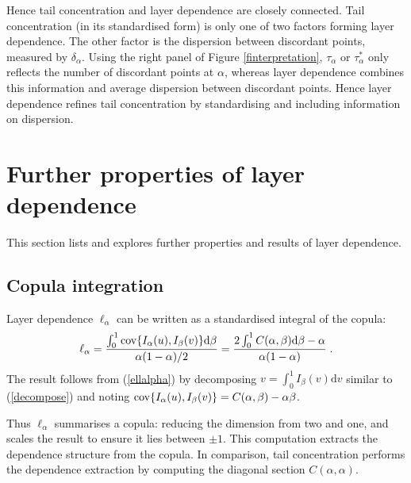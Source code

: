 \documentclass[authoryear]{elsarticle}
\newcommand{\cov}{{\rm cov}}
\newcommand{\de}{\mathrm{d}}
\newcommand{\eref}[1]{(\ref{#1})}
\newcommand{\fref}[1]{Figure \ref{#1}}
\begin{document}
Hence  tail concentration and layer dependence are closely connected. Tail concentration (in its standardised form) is only one of two factors forming layer dependence. The other factor is the dispersion between discordant points, measured by $\delta_\alpha$. Using the right panel of \fref{finterpretation}, $\tau_\alpha$ or $\tau_\alpha^*$ only reflects the number of discordant points at $\alpha$, whereas layer dependence combines this information and average dispersion between discordant points. Hence layer dependence refines tail concentration by standardising and  including  information on dispersion.





\section{Further properties of layer dependence}\label{sproperties}

This section lists and explores further properties and results of layer dependence.




\subsection{Copula integration}

Layer dependence $\ell_\alpha$ can be written as a standardised integral of the copula:
\begin{equation}\label{copula}
\ell_\alpha = \frac{\int_0^1 \cov\{I_\alpha(u),I_\beta(v)\} \de\beta }{\alpha(1-\alpha)/2}
= \frac{2 \int_0^1 C(\alpha,\beta) \de \beta- \alpha}{\alpha(1-\alpha)} \;.
\end{equation}
The result follows from \eref{ellalpha} by decomposing $v=\int_0^1 I_\beta(v)\de v$ similar to \eref{decompose} and noting $\cov\{I_\alpha(u),I_\beta(v)\}=C(\alpha,\beta)-\alpha\beta$.

Thus $\ell_\alpha$ summarises a copula: reducing the dimension from two and one, and scales the result to ensure it lies between $\pm 1$. This computation extracts the dependence structure from the copula. In comparison, tail concentration performs the dependence extraction by computing the diagonal section $C(\alpha,\alpha)$.

\end{document}
